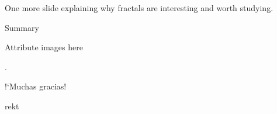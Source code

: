 \documentclass[12pt]{beamer}
\begin{document}
\begin{frame}
 	One more slide explaining why fractals are interesting and worth studying.
\end{frame}

\begin{frame}[standout]
 	Summary
\end{frame}

\begin{frame}
 	Attribute images here
\end{frame}

\begin{frame}[standout]
	\phantom.
	\vspace{3cm}

	\Huge !`\hspace{0.1em}Muchas gracias\hspace{0.1em}!
	
	\vspace{3cm}
	\hfill\scriptsize{\textcolor{white!50!black}{rekt}}
\end{frame}
\end{document}
